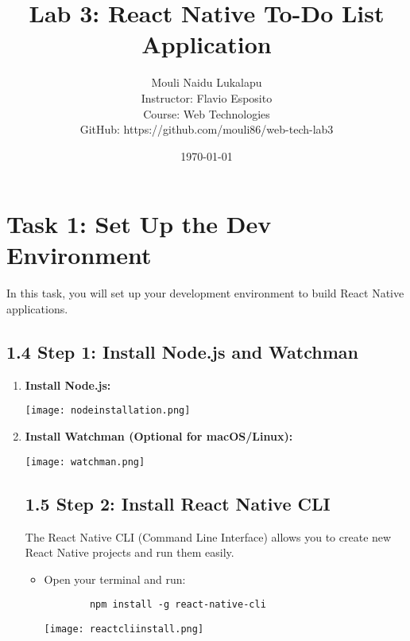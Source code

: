 \documentclass{article}
\title{Lab 3: React Native To-Do List Application}
\author{Mouli Naidu Lukalapu \\
Instructor: Flavio Esposito \\
Course: Web Technologies\\
GitHub: https://github.com/mouli86/web-tech-lab3}
\date{\today}
\begin{document}
\maketitle

\section*{Task 1: Set Up the Dev Environment}

In this task, you will set up your development environment to build React Native applications.

\subsection*{1.4 Step 1: Install Node.js and Watchman}

\begin{enumerate}
    \item \textbf{Install Node.js:}
        \begin{itemize}
           
                \centering
                \texttt{[image: nodeinstallation.png]}\\
                
          
        \end{itemize}
    \item \textbf{Install Watchman (Optional for macOS/Linux):}
        \begin{itemize}
            \centering
            \texttt{[image: watchman.png]}\\
                \end{itemize}
                \enditem

\subsection*{1.5 Step 2: Install React Native CLI}

The React Native CLI (Command Line Interface) allows you to create new React Native projects and run them easily.

\begin{itemize}
    \item Open your terminal and run:
        \begin{verbatim}
        npm install -g react-native-cli

        \end{verbatim}
         \centering
                \texttt{[image: reactcliinstall.png]}\\
                

\end{itemize}
\end{enumerate}
\end{document}
